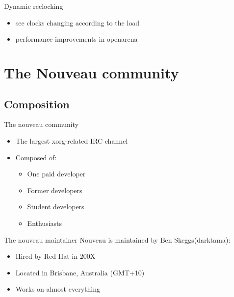 \documentclass[11pt,english,compress]{beamer}
\begin{document}
	\begin{frame}
		\begin{block}{Dynamic reclocking}
			\begin{itemize}
				\item see clocks changing according to the load
				\item performance improvements in openarena
			\end{itemize}
		\end{block}
	\end{frame}

\section{The Nouveau community}
	\subsection{Composition}
		\begin{frame}
			\begin{block}{The nouveau community}
				\begin{itemize}
					\item The largest xorg-related IRC channel
					\item Composed of:
						\begin{itemize}
							\item One paid developer
							\item Former developers
							\item Student developers
							\item Enthusiasts
						\end{itemize}
				\end{itemize}
			\end{block}

			\begin{block}{The nouveau maintainer}
				Nouveau is maintained by Ben Skeggs(darktama):
				\begin{itemize}
					\item Hired by Red Hat in 200X
					\item Located in Brisbane, Australia (GMT+10)
					\item Works on almost everything
				\end{itemize}
			\end{block}
		\end{frame}
\end{document}
